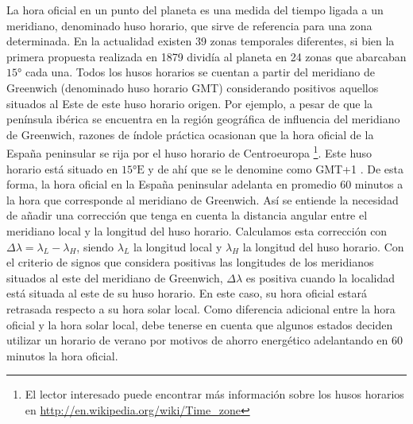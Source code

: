 La hora oficial en un punto del planeta es una medida del tiempo ligada
a un meridiano, denominado huso horario, que sirve de referencia para
una zona determinada. En la actualidad existen 39 zonas temporales
diferentes, si bien la primera propuesta realizada en 1879 dividía
al planeta en 24 zonas que abarcaban $\ang{15}$ cada una. Todos
los husos horarios se cuentan a partir del meridiano de Greenwich
(denominado huso horario GMT) considerando positivos aquellos situados
al Este de este huso horario origen. Por ejemplo, a pesar de que la
península ibérica se encuentra en la región geográfica de influencia
del meridiano de Greenwich, razones de índole práctica ocasionan que
la hora oficial de la España peninsular se rija por el huso horario
de Centroeuropa%
\footnote{El lector interesado puede encontrar más información sobre los husos
horarios en \url{http://en.wikipedia.org/wiki/Time_zone}%
}. Este huso horario está situado en $\ang{15}\mathrm{E}$ y de ahí
que se le denomine como GMT+1 . De esta forma, la hora oficial en
la España peninsular adelanta en promedio 60 minutos a la hora que
corresponde al meridiano de Greenwich. Así se entiende la necesidad
de añadir una corrección que tenga en cuenta la distancia angular
entre el meridiano local y la longitud del huso horario. Calculamos
esta corrección con $\Delta\lambda=\lambda_{L}-\lambda_{H}$, siendo
$\lambda_{L}$ la longitud local y
$\lambda_{H}$ la longitud del huso horario.
Con el criterio de signos que considera positivas las longitudes de
los meridianos situados al este del meridiano de Greenwich, $\Delta\lambda$
es
positiva cuando la localidad está situada al este de su huso horario.
En este caso, su hora oficial estará retrasada respecto a su hora
solar local. Como diferencia adicional entre la hora oficial y la
hora solar local, debe tenerse en cuenta que algunos estados deciden
utilizar un horario de verano por motivos de ahorro energético adelantando
en 60 minutos la hora oficial. 

